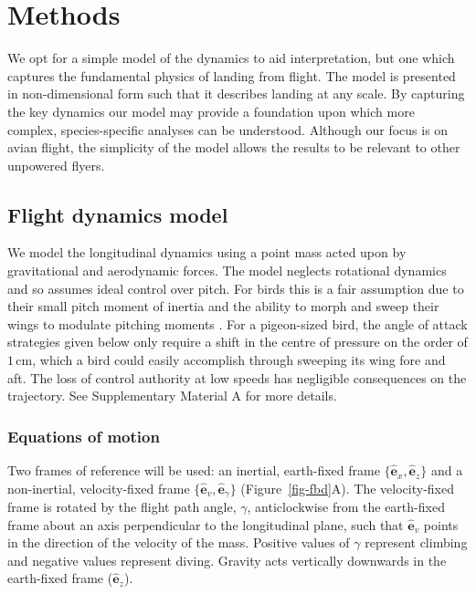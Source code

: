 \providecommand{\stallspeed}{\nu_{\text{stall}}}
\providecommand{\termspeed}{\nu_{\text{term}}}

\section{Methods}\label{sec-methods}

We opt for a simple model of the dynamics to aid interpretation, but one which captures the fundamental physics of landing from flight. The model is presented in non-dimensional form such that it describes landing at any scale. By capturing the key dynamics our model may provide a foundation upon which more complex, species-specific analyses can be understood. Although our focus is on avian flight, the simplicity of the model allows the results to be relevant to other unpowered flyers.

\subsection{Flight dynamics model}\label{sec-methods-dynamics}

We model the longitudinal dynamics using a point mass acted upon by gravitational and aerodynamic forces. The model neglects rotational dynamics and so assumes ideal control over pitch. For birds this is a fair assumption due to their small pitch moment of inertia \cite{bergMomentInertiaBird1995,harveyBirdsCanTransition2022} and the ability to morph and sweep their wings to modulate pitching moments \cite{harveyGullinspiredJointdrivenWing2021}. For a pigeon-sized bird, the angle of attack strategies given below only require a shift in the centre of pressure on the order of $1\,\text{cm}$, which a bird could easily accomplish through sweeping its wing fore and aft. The loss of control authority at low speeds has negligible consequences on the trajectory. See Supplementary Material A for more details.

\subsubsection{Equations of motion}\label{sec-methods-eom}

Two frames of reference will be used: an inertial, earth-fixed frame $\{\hat{\mathbf{e}}_x, \hat{\mathbf{e}}_z\}$ and a non-inertial, velocity-fixed frame $\{\hat{\mathbf{e}}_v, \hat{\mathbf{e}}_\gamma\}$ (Figure~\ref{fig-fbd}A). The velocity-fixed frame is rotated by the flight path angle, $\gamma$, anticlockwise from the earth-fixed frame about an axis perpendicular to the longitudinal plane, such that $\hat{\mathbf{e}}_v$ points in the direction of the velocity of the mass. Positive values of $\gamma$ represent climbing and negative values represent diving. Gravity acts vertically downwards in the earth-fixed frame ($\hat{\mathbf{e}}_z$).

